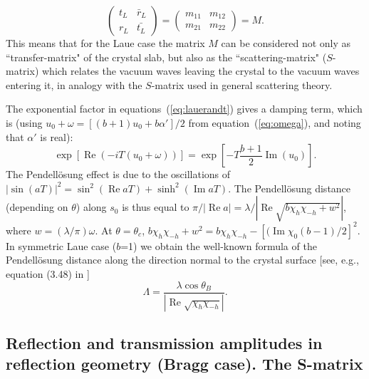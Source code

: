\documentclass[preprint]{iucr}              %
\begin{document}
\begin{equation}\label{eq:MtransferLaue}
    \begin{pmatrix}
    t_L & \bar{r}_L\\
    r_L & \bar{t_L}
    \end{pmatrix}
    =
    \begin{pmatrix}
    m_{11} & m_{12}\\
    m_{21} & m_{22}
    \end{pmatrix}
    = M.
\end{equation}
This means that for the Laue case the matrix $M$ can be considered not only as ``transfer-matrix" of the crystal slab, but also as the ``scattering-matrix" ($S$-matrix) which relates the vacuum waves leaving the crystal to the vacuum waves entering it, in analogy with the $S$-matrix used in general scattering theory.  

The exponential factor in equations~(\ref{eq:lauerandt}) gives a damping term, which is (using $u_0 +\omega=[(b+1)u_0+b\alpha']/2$ from equation~({\ref{eq:omega}}), 
and noting that $\alpha'$ is real):  
\begin{equation}
   \exp[\operatorname{Re}(-iT(u_0+\omega))] = 
    \exp[-T \frac{b+1}{2}\operatorname{Im}(u_0)].
\end{equation}
The Pendell\"osung effect is due to the oscillations of $|\sin(aT)|^2=\sin^2(\operatorname{Re} aT) + \sinh^2(\operatorname{Im}aT)$.
The Pendell\"osung distance (depending on $\theta$) along $s_0$ is thus equal to  
$\pi / |\operatorname{Re} a|=\lambda / |\operatorname{Re}\sqrt{b\chi_h\chi_{-h} + w^2}|$, where $w=(\lambda / \pi) \omega $.
At $\theta=\theta_c$, $b \chi_h \chi_{-h}+w^2=b \chi_h \chi_{-h} - [(\operatorname{Im}\chi_0(b-1)/2]^2$. In symmetric Laue case ($b$=1) we obtain the well-known formula of the Pendell\"osung distance along the direction normal to the crystal surface [see, e.g., equation (3.48) in \cite{pinskerbook}]
\begin{equation}\label{eq:Pendellosung}
    \Lambda =\frac{\lambda \cos\theta_B}{|\operatorname{Re}\sqrt{\chi_h\chi_{-h}}|} .
\end{equation}

\subsection{Reflection and transmission amplitudes in reflection geometry (Bragg case). The S-matrix}
\label{sec:TTsolutionsBragg}
\end{document}
